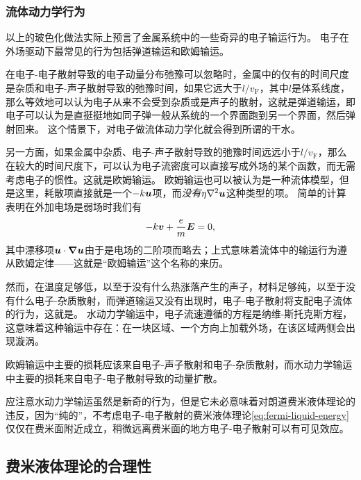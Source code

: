 \subsubsection{流体动力学行为}


以上的玻色化做法实际上预言了金属系统中的一些奇异的电子输运行为。
电子在外场驱动下最常见的行为包括弹道输运和欧姆输运。

在电子-电子散射导致的电子动量分布弛豫可以忽略时，金属中的仅有的时间尺度是杂质和电子-声子散射导致的弛豫时间，如果它远大于$l / v_\text{F}$，其中$l$是体系线度，那么等效地可以认为电子从来不会受到杂质或是声子的散射，这就是弹道输运，即电子可以认为是直挺挺地如同子弹一般从系统的一个界面跑到另一个界面，然后弹射回来。
这个情景下，对电子做流体动力学化就会得到所谓的干水。

另一方面，如果金属中杂质、电子-声子散射导致的弛豫时间远远小于$l / v_\text{F}$，那么在较大的时间尺度下，可以认为电子流密度可以直接写成外场的某个函数，而无需考虑电子的惯性。这就是欧姆输运。
欧姆输运也可以被认为是一种流体模型，但是这里，耗散项直接就是一个$- k \vb*{u}$项，而\emph{没有}$\eta \laplacian \vb*{u}$这种类型的项。
简单的计算表明在外加电场是弱场时我们有
\begin{equation}
    - k \vb*{v} + \frac{e}{m} \vb*{E} = 0,
\end{equation}
其中漂移项$\vb*{u} \cdot \grad \vb*{u}$由于是电场的二阶项而略去；上式意味着流体中的输运行为遵从欧姆定律——这就是“欧姆输运”这个名称的来历。

然而，在温度足够低，以至于没有什么热涨落产生的声子，材料足够纯，以至于没有什么电子-杂质散射，而弹道输运又没有出现时，电子-电子散射将支配电子流体的行为，这就是。
水动力学输运中，电子流速遵循的方程是纳维-斯托克斯方程，这意味着这种输运中存在：在一块区域、一个方向上加载外场，在该区域两侧会出现漩涡。

欧姆输运中主要的损耗应该来自电子-声子散射和电子-杂质散射，而水动力学输运中主要的损耗来自电子-电子散射导致的动量扩散。

应注意水动力学输运虽然是新奇的行为，但是它未必意味着对朗道费米液体理论的违反，因为“纯的”，不考虑电子-电子散射的费米液体理论\eqref{eq:fermi-liquid-energy}仅仅在费米面附近成立，稍微远离费米面的地方电子-电子散射可以有可见效应。

\subsection{费米液体理论的合理性}\label{sec:why-fermi-liquid-works}

